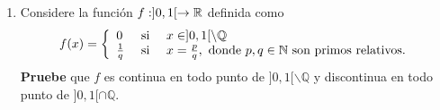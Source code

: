\documentclass[12pt]{article}
\begin{document}
\begin{enumerate}
\begin{proof}
\begin{equation*}
\begin{split}
                &=\frac{p}{q}f(1)\\
                \Rightarrow f\left(\frac{p}{q}\right)&=a\frac{p}{q}
            \end{split}
        \end{equation*}
        (donde recordemos que $a=f(1)$). Se sigue entonces que $f(a)$. Por tanto, $f(x)=ax$ para todo $x\in\mathbb{Q}^+$. Si ahora $x\in\mathbb{R}$, se tiene que
        \begin{equation*}
            0=f(0)=f(x-x)=f(x)+f(-x)\Rightarrow -f(x)=f(-x)
        \end{equation*}
        por tanto, si $r\in\mathbb{Q}^-$,
        \begin{equation*}
            f(r)=-f(-r)=-a\cdot(-r)=ar
        \end{equation*}
        (pues $-r\in\mathbb{Q}^+$) luego,
        \begin{equation*}
            f(x)=ax,\quad\forall x\in\mathbb{Q}
        \end{equation*}
        
        Sea ahora $x_0\in\mathbb{I}$. Se sabe que existe $\left\{x_n \right\}_{ n=1}^\infty$ una sucesión en $\mathbb{Q}$ que converge a $x_0$. Como $f$ es continua en $\mathbb{R}$, en particular lo es en $x_0$, luego
        \begin{equation*}
            f(x_0)=\lim_{n\rightarrow\infty}f(x_n)=\lim_{n\rightarrow\infty}ax_n=ax_0
        \end{equation*}
        Por tanto, $f(x)=ax$ para todo $x\in\mathbb{I}$. Se concluye finalmente que
        \begin{equation*}
            f(x)=ax,\quad\forall x\in\mathbb{R}
        \end{equation*}
        donde $a=f(1)$.
    \end{proof}

    \item Considere la función $f:]0,1[\rightarrow\mathbb{R}$ definida como
    \begin{equation*}
        f(x)=\left\{\begin{array}{lcl}
            0 & \textup{ si } & x\in]0,1[\backslash\mathbb{Q}\\
            \frac{1}{q} & \textup{ si } & x=\frac{p}{q}, \textup{ donde }p,q\in\mathbb{N}\textup{ son primos relativos.}
        \end{array} \right.
    \end{equation*}
    \textbf{Pruebe} que $f$ es continua en todo punto de $]0,1[\backslash\mathbb{Q}$ y discontinua en todo punto de $]0,1[\cap\mathbb{Q}$.


\end{enumerate}
\end{document}
